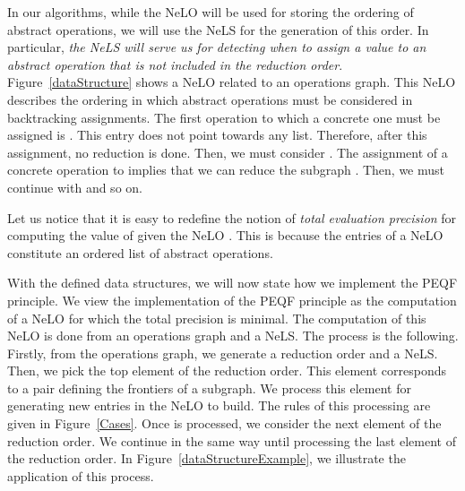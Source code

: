 \documentclass[a4paper]{article}
\begin{document}
In our algorithms, while the NeLO will be used for storing the ordering of abstract operations, we 
will use the NeLS for the generation of this order. In particular, {\it the NeLS will serve us for 
detecting when to assign a value to an abstract operation that is not included in the reduction order}. 
Figure~\ref{dataStructure}  shows a NeLO related to an operations graph. This NeLO describes the ordering in 
which abstract operations must be considered in backtracking assignments. The first 
operation to which a concrete one must be assigned is . This entry does not point towards any list. 
Therefore, after this assignment, no reduction is done. Then, we must consider . The assignment of 
a concrete operation to  implies that we can reduce the subgraph . 
Then, we must continue with  and so on. 

Let us notice that it is easy to redefine the notion of {\it total evaluation precision} for 
computing the value of  given the NeLO . This is because the entries of a NeLO 
constitute an ordered list of abstract operations. 

With the defined data structures, we will now state how we implement the 
PEQF principle. We view the implementation of the PEQF principle as the computation of a NeLO for which the 
total precision is minimal. The computation of this NeLO is done from an operations graph and a NeLS. 
The process is the following. Firstly, from the operations graph, we generate a reduction order and a NeLS. 
Then, we pick the top element of the reduction order. This element corresponds to a pair  defining the 
frontiers of a subgraph. We process this element for generating new entries in the NeLO to build. The rules of 
this processing are given in Figure~\ref{Cases}. Once  is processed, we consider the next element of the 
reduction order. We continue in the same way until processing the last element 
of the reduction order. In Figure~\ref{dataStructureExample}, we illustrate the application of 
this process. 
\end{document}
